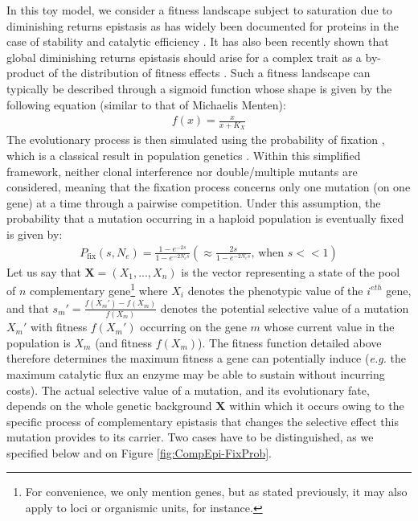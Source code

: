 In this toy model, we consider a fitness landscape subject to saturation due to diminishing returns epistasis \citep{Tokuriki12,Kaltenbach14} as has widely been documented for proteins in the case of stability \citep{Taverna02,Bloom05,Bloom06,Kaltenbach14} and catalytic efficiency \citep{Dykhuizen87,Hartl85,Yi19,Labourel21}. It has also been recently shown that global diminishing returns epistasis \citep{Kryazhimskiy14,Bahcall14,Otwinowski18} should arise for a complex trait as a by-product of the distribution of fitness effects \citep{Reddy20}. Such a fitness landscape can typically be described through a sigmoid function whose shape is given by the following equation (similar to that of Michaelis Menten):
\begin{align}
    f(x)=\frac{x}{x+K_X}
    \label{eq_sat}
\end{align}
The evolutionary process is then simulated using the probability of fixation \citep{McCandlish14}, which is a classical result in population genetics \citep{Haldane27,Kimura62,Wright31}. Within this simplified framework, neither clonal interference nor double/multiple mutants are considered, meaning that the fixation process concerns only one mutation (on one gene) at a time through a pairwise competition. Under this assumption, the probability that a mutation occurring in a haploid population is eventually fixed is given by:
\begin{align}
    P_{\text{fix}}(s,N_e)=\frac{1-e^{-2s}}{1-e^{-2N_es}}(\approx \frac{2s}{1-e^{-2N_es}} \text{, when $s<<1$})
\end{align}
 Let us say that $\mathbf{X}=(X_1,...,X_n)$ is the vector representing a state of the pool of $n$ complementary gene\footnote{For convenience, we only mention genes, but as stated previously, it may also apply to loci or organismic units, for instance.} where  $X_i$ denotes the phenotypic value of the $i^{eth}$ gene, and that $s_m'=\frac{f(X_m')-f(X_m)}{f(X_m)}$ denotes the potential selective value of a mutation $X_m'$ with fitness $f(X_m')$ occurring on the gene $m$ whose current value in the population is $X_m$ (and fitness $f(X_m)$). The fitness function detailed above therefore determines the maximum fitness a gene can potentially induce (\textit{e.g.} the maximum catalytic flux an enzyme may be able to sustain without incurring costs). The actual selective value of a mutation, and its evolutionary fate, depends on the whole genetic background $\mathbf{X}$ within which it occurs owing to the specific process of complementary epistasis that changes the selective effect this mutation provides to its carrier. Two cases have to be distinguished, as we specified below and on Figure \ref{fig:CompEpi-FixProb}.
 

